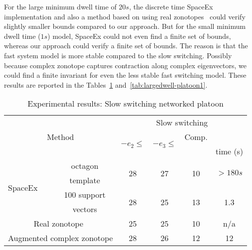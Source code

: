   For the large minimum dwell time of $20s$, the
discrete time SpaceEx implementation and also a method based on using
real zonotopes~\cite{makhlouf2014networked} could verify slightly
smaller bounds compared to our approach.  But for the small minimum
dwell time ($1s$) model, SpaceEx could not even find a finite set of
bounds, whereas our approach could verify a finite set of bounds.  The
reason is that the fast system model is more stable compared to the
slow switching.  Possibly because complex zonotope captures
contraction along complex eigenvectors, we could find a finite
invariant for even the less stable fast switching model.  These
results are reported in the Tables~\ref{tab:largedwell-platoon}
and~\ref{tab:largedwell-platoon1}.
%

\begin{table}
\begin{tabular}{|l|c|c|c|c|c|}
\hline
\multicolumn{2}{|c|}{\multirow{4}{*}{Method}} & \multicolumn{4}{|c|}{\multirow{2}{*}{Slow switching}}\\
\multicolumn{2}{|c|}{} & \multicolumn{4}{|c|}{}\\
\cline{3-6}
\multicolumn{2}{|c|}{} & \multirow{2}{*}{$-e_1\leq$} & \multirow{2}{*}{$-e_2\leq$} & \multirow{2}{*}{$-e_3\leq$} & Comp.\\
\multicolumn{2}{|c|}{} & & & & time (s)\\
\hline
\multirow{4}{*}{SpaceEx} & octagon & \multirow{2}{*}{28} &
\multirow{2}{*}{27} & \multirow{2}{*}{10}& \multirow{2}{*}{$>180s$}\\
& template & & & &\\
\cline{2-6}
& 100 support & \multirow{2}{*}{28} & \multirow{2}{*}{25} &
\multirow{2}{*}{13} & \multirow{2}{*}{1.3}\\
& vectors & & & &\\
\hline
\multicolumn{2}{|c|}{\multirow{2}{*}{Real zonotope~\cite{makhlouf2014networked}}} &
\multirow{2}{*}{25} & \multirow{2}{*}{25} & \multirow{2}{*}{10} & \multirow{2}{*}{n/a}\\
\multicolumn{2}{|c|}{} & & & &\\
\hline
\multicolumn{2}{|c|}{\multirow{2}{*}{Augmented complex zonotope}} &
\multirow{2}{*}{28} & \multirow{2}{*}{26} &
\multirow{2}{*}{12} & \multirow{2}{*}{12}\\
\multicolumn{2}{|c|}{} & & & & \\
\hline
\end{tabular}
\caption{Experimental results: Slow switching networked platoon}~\label{tab:largedwell-platoon}


\end{table}
